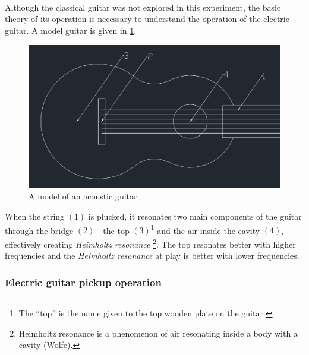 \documentclass{article}
\begin{document}
\paragraph*{}
Although the classical guitar was not explored in this experiment, the basic 
theory of its operation is necessary to understand the operation of the 
electric guitar. A model guitar is given in \ref{fig:ac-guitar}.
\begin{figure}[ht]
	\centering
	\includegraphics[width=.5\textwidth]{img/ac-guitar}
	\caption{A model of an acoustic guitar}
	\label{fig:ac-guitar}
\end{figure}
When the string $(1)$ is plucked, it resonates two main components of the 
guitar through the bridge $(2)$ - the top $(3)$\footnote{The ``top'' is the 
name given to the top wooden plate on the guitar.} and the air inside the 
cavity $(4)$, effectively creating \textit{Heimholtz resonance}
\footnote{Heimholtz resonance is a phenomenon of air resonating inside a body 
	with a cavity (Wolfe).}. The top resonates better with higher frequencies 
and the \textit{Heimholtz resonance} at play is better with lower frequencies.

\subsubsection{Electric guitar pickup operation}
\end{document}
